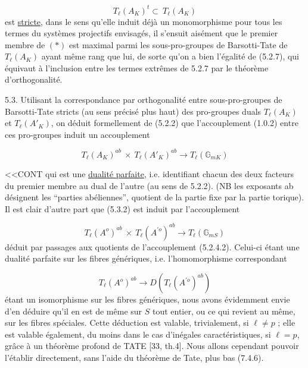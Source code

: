 \begin{equation}\tag{*}
T_\ell(A_K)^t \subset \ T_\ell(A_K)
\end{equation}
est \underline{stricte}, dans le sens qu'elle induit déjà un monomorphisme pour tous les termes du systèmes projectifs envisagés, il s'ensuit aisément que le premier membre de $(*)$ est maximal parmi les sous-pro-groupes de Barsotti-Tate de $T_\ell(A_K)$ ayant même rang que lui, de sorte qu'on a bien l'égalité de (5.2.7), qui équivaut à l'inclusion entre les termes extrêmes de 5.2.7 par le théorème d'orthogonalité.

5.3. Utilisant la correspondance par orthogonalité entre sous-pro-groupes de Barsotti-Tate stricts (au sens précisé plus haut) des pro-groupes duals $T_\ell(A_K)$ et $T_\ell(A'_K)$, on déduit formellement de (5.2.2) que l'accouplement (1.0.2) entre ces pro-groupes induit un accouplement

\begin{equation}\tag{5.3.2}
T_\ell(A_K)^{ab} \ \times \ T_\ell(A'_K)^{ab} \longrightarrow T_\ell(\mathbb{G}_{mK})
\end{equation}


<<CONT qui est une \underline{dualité parfaite}, i.e. identifiant chacun des deux facteurs du premier membre au dual de l'autre (au sens de 5.2.2). (NB les exposants ab désignent les ``parties abéliennes'', quotient de la partie fixe par la partie torique). Il est clair d'autre part que (5.3.2) est induit par l'accouplement

\begin{equation}\tag{5.3.3}
T_\ell(A^o)^{ab} \ \times \ T_\ell(A^{\prime o})^{ab} \longrightarrow T_\ell(\mathbb{G}_{mS})
\end{equation}
déduit par passages aux quotients de l'accouplement (5.2.4.2). Celui-ci étant une dualité parfaite sur les fibres génériques, i.e. l'homomorphisme correspondant

\begin{equation}\tag{5.3.4}
T_\ell(A^o)^{ab} \longrightarrow D(T_\ell(A^{\prime o})^{ab})
\end{equation}
étant un isomorphisme sur les fibres génériques, nous avons évidemment envie d'en déduire qu'il en est de même sur $S$ tout entier, ou ce qui revient au même, sur les fibres spéciales. Cette déduction est valable, trivialement, si $\ell \neq p$ ; elle est valable également, du moins dans le cas d'inégales caractéristiques, si $\ell = p$, grâce à un théorème profond de TATE [33, th.4]. Nous allons cependant pouvoir l'établir directement, sans l'aide du théorème de Tate, plus bas (7.4.6).

